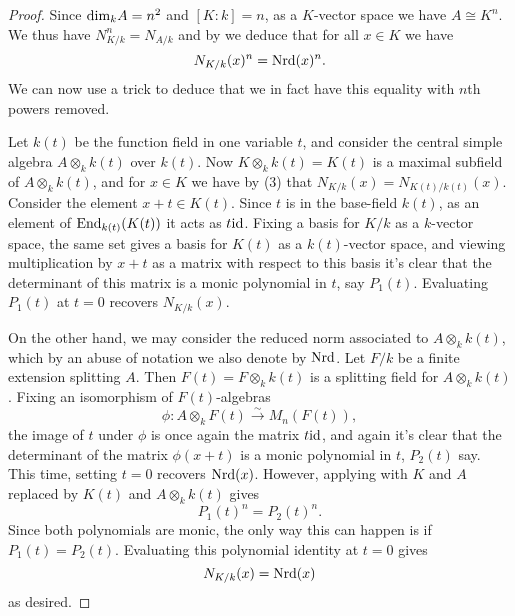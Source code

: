 \documentclass[11pt]{amsart}
\numberwithin{equation}{section}
\theoremstyle{remark}
\theoremstyle{remark}
\theoremstyle{remark}
\theoremstyle{definition}
\theoremstyle{definition}
\theoremstyle{definition}
\theoremstyle{definition}
\theoremstyle{definition}
\theoremstyle{definition}
\begin{document}
\begin{proof}
Since $\textup{dim}_kA=n^2$ and $[K:k]=n$, as a $K$-vector space we have $A\cong K^n$. We thus have $N_{K/k}^n=N_{A/k}$
and by  we deduce that for all $x\in K$ we have
\begin{equation}\label{relationship of norm eqn}
N_{K/k}(x)^n=\textup{Nrd}(x)^n.
\end{equation}
We can now use a trick to deduce that we in fact have this equality with $n$th powers removed. 

Let $k(t)$ be the function field in one variable $t$, and consider the central simple algebra $A\otimes_k k(t)$ over $k(t)$. Now $K\otimes_k k(t)=K(t)$ is a maximal subfield of $A\otimes_k k(t)$, and for $x\in K$ we have by  (3) that $N_{K/k}(x)=N_{K(t)/k(t)}(x)$. Consider the element $x+t\in K(t)$. Since $t$ is in the base-field $k(t)$, as an element of $\textup{End}_{k(t)}(K(t))$ it acts as $t\textup{id}$. Fixing a basis for $K/k$ as a $k$-vector space, the same set gives a basis for $K(t)$ as a $k(t)$-vector space, and viewing multiplication by $x+t$ as a matrix with respect to this basis it's clear that the determinant of this matrix is a monic polynomial in $t$, say $P_1(t)$. Evaluating $P_1(t)$ at $t=0$ recovers $N_{K/k}(x)$.

On the other hand, we may consider the reduced norm associated to $A\otimes_k k(t)$, which by an abuse of notation we also denote by $\textup{Nrd}$. Let $F/k$ be a finite extension splitting $A$. Then $F(t)=F\otimes_k k(t)$ is a splitting field for $A\otimes_k k(t)$. Fixing an isomorphism of $F(t)$-algebras
\[\phi:A\otimes_k F(t)\stackrel{\sim}{\longrightarrow}M_n(F(t)),\]
the image of $t$ under $\phi$ is once again the matrix $t\textup{id}$, and again it's clear that the determinant of the matrix $\phi(x+t)$ is a monic polynomial in $t$, $P_2(t)$ say. This time, setting $t=0$ recovers $\textup{Nrd}(x)$. However, applying  with $K$ and $A$ replaced by $K(t)$ and $A\otimes_k k(t)$ gives
\[P_1(t)^n=P_2(t)^n.\]
Since both polynomials are monic, the only way this can happen is if $P_1(t)=P_2(t)$. Evaluating this polynomial identity at $t=0$ gives
\[N_{K/k}(x)=\textup{Nrd}(x)\]
as desired.
\end{proof}
\end{document}
